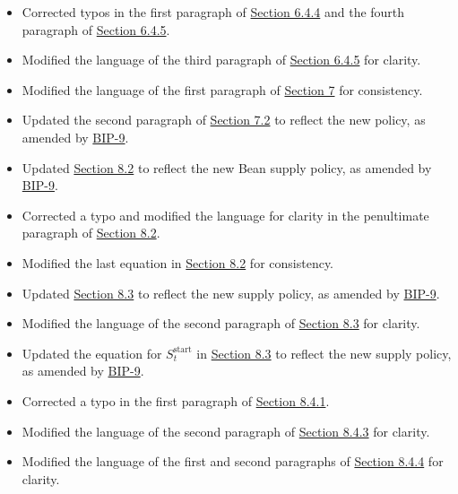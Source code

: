 \documentclass[class=article, crop=false]{standalone}
\begin{document}
\begin{itemize}[topsep=0pt, itemsep=3pt,leftmargin=16pt]
\begin{itemize}
        \item Corrected typos in the first paragraph of \hyperlink{subsubsection.6.4.4}{Section 6.4.4} and the fourth paragraph of \hyperlink{subsubsection.6.4.5}{Section 6.4.5}.
        \item Modified the language of the third paragraph of \hyperlink{subsubsection.6.4.5}{Section 6.4.5} for clarity.
        \item Modified the language of the first paragraph of \hyperlink{section.7}{Section 7} for consistency.
        \item Updated the second paragraph of \hyperlink{subsection.7.2}{Section 7.2} to reflect the new  policy, as amended by \href{https://github.com/BeanstalkFarms/Beanstalk-Governance-Proposals/blob/master/bip/bip-09-efficiency-improvements.md}{BIP-9}.
        \item Updated \hyperlink{subsection.8.2}{Section 8.2} to reflect the new Bean supply policy, as amended by \href{https://github.com/BeanstalkFarms/Beanstalk-Governance-Proposals/blob/master/bip/bip-09-efficiency-improvements.md}{BIP-9}.
        \item Corrected a typo and modified the language for clarity in the penultimate paragraph of \hyperlink{subsection.8.2}{Section 8.2}.
        \item Modified the last equation in \hyperlink{subsection.8.2}{Section 8.2} for consistency.
        \item Updated \hyperlink{subsection.8.3}{Section 8.3} to reflect the new  supply policy, as amended by \href{https://github.com/BeanstalkFarms/Beanstalk-Governance-Proposals/blob/master/bip/bip-09-efficiency-improvements.md}{BIP-9}.
        \item Modified the language of the second paragraph of \hyperlink{subsection.8.3}{Section 8.3} for clarity.
        \item Updated the equation for $S_t^{\text{start}}$ in \hyperlink{subsection.8.3}{Section 8.3} to reflect the new  supply policy, as amended by \href{https://github.com/BeanstalkFarms/Beanstalk-Governance-Proposals/blob/master/bip/bip-09-efficiency-improvements.md}{BIP-9}.
        \item Corrected a typo in the first paragraph of \hyperlink{subsubsection.8.4.1}{Section 8.4.1}.
        \item Modified the language of the second paragraph of \hyperlink{subsubsection.8.4.3}{Section 8.4.3} for clarity.
        \item Modified the language of the first and second paragraphs of \hyperlink{subsubsection.8.4.4}{Section 8.4.4} for clarity.

\end{itemize}
\end{itemize}
\end{document}
